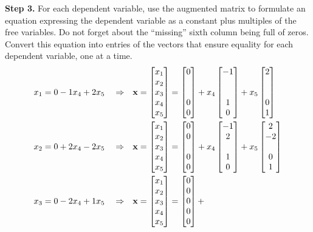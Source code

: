 \documentclass{ximera}
\begin{document}
\begin{example}
  \textbf{Step 3.}  For each dependent variable, use the augmented
  matrix to formulate an equation expressing the dependent variable as
  a constant plus multiples of the free variables.  Do not forget
  about the ``missing'' sixth column being full of zeros.  Convert
  this equation into entries of the vectors that ensure equality for
  each dependent variable, one at a time.
  \begin{align*}
    x_1&=0-1x_4+2x_5&&\Rightarrow&&
                                    \vect{x}=\colvector{x_1\\x_2\\x_3\\x_4\\x_5}=
    \colvector{0\\\ \\\ \\0\\0}+
    x_4\colvector{-1\\\ \\\ \\1\\0}+
    x_5\colvector{2\\\ \\\ \\0\\1}\\
    x_2&=0+2x_4-2x_5&&\Rightarrow&&
                                    \vect{x}=\colvector{x_1\\x_2\\x_3\\x_4\\x_5}=
    \colvector{0\\0\\\ \\0\\0}+
    x_4\colvector{-1\\2\\\ \\1\\0}+
    x_5\colvector{2\\-2\\\ \\0\\1}\\
    x_3&=0-2x_4+1x_5&&\Rightarrow&&
                                    \vect{x}=\colvector{x_1\\x_2\\x_3\\x_4\\x_5}=
    \colvector{0\\0\\0\\0\\0}+

\end{align*}
\end{example}
\end{document}
